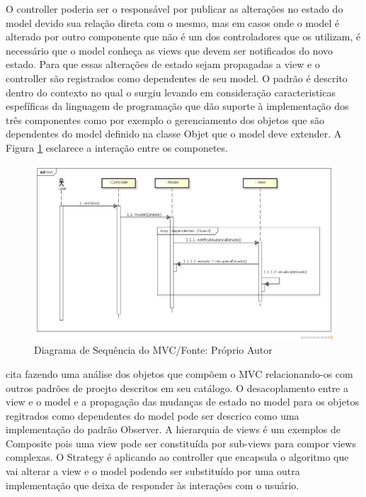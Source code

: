 O controller poderia ser o responsável por publicar as alterações no estado do
model devido sua relação direta com o mesmo, mas em casos onde o model é
alterado por outro componente que não é um dos controladores que os utilizam, é
necessário que o model conheça as views que devem ser notificados do novo
estado. Para que essas alterações de estado sejam propagadas a view e o
controller são registrados como dependentes de seu model. O padrão é descrito
dentro do contexto no qual o surgiu levando em consideração caracteristicas
espefíficas da  linguagem de programação que dão suporte à implementação dos
três componentes como por exemplo o gerenciamento dos objetos que são
dependentes do model definido na classe Objet que o model deve extender. A
Figura \ref{mvc_seq} esclarece a interação entre os componetes.

\begin{figure}[h]
	\centering
	\includegraphics[scale=0.5]{img/mvc_seq.png}
	\caption{Diagrama de Sequência do MVC/Fonte: Próprio Autor}
	\label{mvc_seq}
\end{figure}

 cita  fazendo uma análise dos
objetos que compõem o MVC relacionando-os com outros padrões de proejto
descritos em seu catálogo.
O desacoplamento entre a view e o model e a propagação das mudanças de estado no
model para os objetos regitrados como dependentes do model pode ser descrico
como uma implementação do padrão Observer. A hierarquia de views é um exemplos
de Composite pois uma view pode ser constituída por sub-views para compor views
complexas. O Strategy é aplicando ao controller que encapsula o algoritmo que
vai alterar a view e o model podendo ser substituído por uma outra
implementação que deixa de responder às interações com o usuário.

